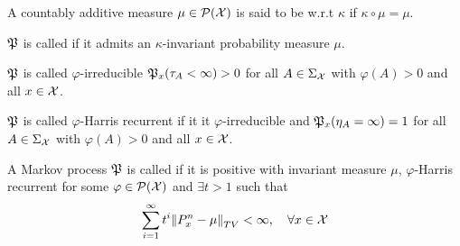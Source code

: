 \begin{defn}
  A countably additive measure $\mu \in \mathcal{P}(\mathcal{X})$ is said
  to be  w.r.t $\kappa$ if $\kappa \circ \mu = \mu$.
\end{defn}

\begin{defn}[Positivity]
  \leavevmode

  $\mathfrak{P}$ is called  if it admits an $\kappa$-invariant
  probability measure $\mu$.
\end{defn}

\begin{defn}[Irreducibility]
  $\mathfrak{P}$ is called $\varphi$-irreducible
  $\mathfrak{P}_x(\tau_A < \infty) > 0$
  for all $A \in \Sigma_\mathcal{X}$
  with $\varphi(A) > 0$
  and all $x \in \mathcal{X}$.
\end{defn}

\begin{defn}
  $\mathfrak{P}$ is called $\varphi$-Harris recurrent if
  it it $\varphi$-irreducible and
  $\mathfrak{P}_x(\eta_A = \infty) = 1$ for all $A \in \Sigma_\mathcal{X}$ with
  $\varphi(A) > 0$ and all $x \in \mathcal{X}$.
\end{defn}

\begin{defn}
  A Markov process $\mathfrak{P}$ is called  if
  it is positive with invariant measure $\mu$, $\varphi$-Harris recurrent
  for some $\varphi \in \mathcal{P}(\mathcal{X})$ and $\exists t>1$ such that
  \[ \sum_{i=1}^\infty t^i \norm{P^n_x - \mu}_{TV} < \infty,
  \quad \forall x \in \mathcal{X} \]
\end{defn}




